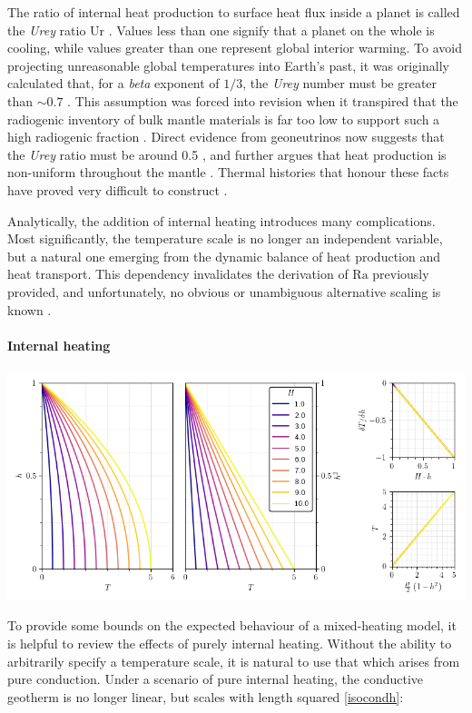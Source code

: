\documentclass[a4paper,11pt,oneside]{book}
\begin{document}
The ratio of internal heat production to surface heat flux inside a planet is called the \textit{Urey} ratio $\mathrm{Ur}$  \cite{Urey1955-zs}. Values less than one signify that a planet on the whole is cooling, while values greater than one represent global interior warming. To avoid projecting unreasonable global temperatures into Earth's past, it was originally calculated that, for a \textit{beta} exponent of $1/3$, the \textit{Urey} number must be greater than $\sim0.7$ \cite{Christensen1985-bu}. This assumption was forced into revision when it transpired that the radiogenic inventory of bulk mantle materials is far too low to support such a high radiogenic fraction \cite{Jochum1983-dn}. Direct evidence from geoneutrinos now suggests that the \textit{Urey} ratio must be around 0.5 \cite{Gando2011-sh}, and further argues that heat production is non-uniform throughout the mantle \cite{Huang2013-eu}. Thermal histories that honour these facts have proved very difficult to construct \citet{Korenaga2003-oy, Korenaga2008-js, Mareschal2012-ie, Dye2012-cx, Jaupart2015-un, Korenaga2017-an}.

Analytically, the addition of internal heating introduces many complications. Most significantly, the temperature scale is no longer an independent variable, but a natural one emerging from the dynamic balance of heat production and heat transport. This dependency invalidates the derivation of $\mathrm{Ra}$ previously provided, and unfortunately, no obvious or unambiguous alternative scaling is known \citet{Schubert2001-ea, Moore2008-je, Korenaga2017-an}.

\paragraph{Internal heating}

\includegraphics[width=0.7\linewidth]{files/7697321490a630ce259b3aa8db4668c0.png}

To provide some bounds on the expected behaviour of a mixed-heating model, it is helpful to review the effects of purely internal heating. Without the ability to arbitrarily specify a temperature scale, it is natural to use that which arises from pure conduction. Under a scenario of pure internal heating, the conductive geotherm is no longer linear, but scales with length squared \cite{Turcotte2014-by} \ref{isocondh}:
\end{document}
